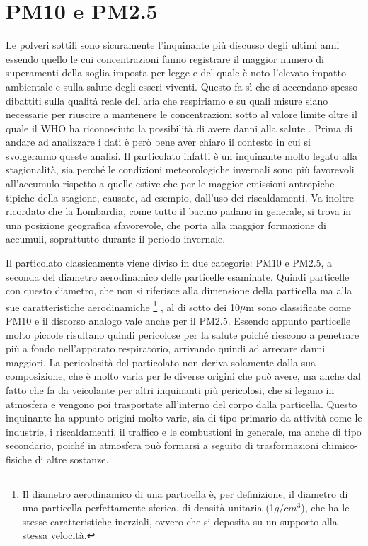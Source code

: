 \section{PM10 e PM2.5}
Le polveri sottili sono sicuramente l'inquinante più discusso degli ultimi anni essendo quello le cui concentrazioni fanno registrare il maggior numero di superamenti della soglia imposta per legge e del quale è noto l'elevato impatto ambientale e sulla salute degli esseri viventi. Questo fa sì che si accendano spesso dibattiti sulla qualità reale dell'aria che respiriamo e su quali misure siano necessarie per riuscire a mantenere le concentrazioni sotto al valore limite oltre il quale il WHO ha riconosciuto la possibilità di avere danni alla salute \cite{world2006air}. Prima di andare ad analizzare i dati è però bene aver chiaro il contesto in cui si svolgeranno queste analisi. Il particolato infatti è un inquinante molto legato alla stagionalità, sia perché le condizioni meteorologiche invernali sono più favorevoli all'accumulo rispetto a quelle estive che per le maggior emissioni antropiche tipiche della stagione, causate, ad esempio, dall'uso dei riscaldamenti. Va inoltre ricordato che la Lombardia, come tutto il bacino padano in generale, si trova in una posizione geografica sfavorevole, che porta alla maggior formazione di accumuli, soprattutto durante il periodo invernale.

Il particolato classicamente viene diviso in due categorie: PM10 e PM2.5, a seconda del diametro aerodinamico delle particelle esaminate. Quindi particelle con questo diametro, che non si riferisce alla dimensione della particella ma alla sue caratteristiche aerodinamiche
\footnote{Il diametro aerodinamico di una particella è, per definizione, il diametro di una particella perfettamente sferica, di densità unitaria (1$g/cm^3$), che ha le stesse caratteristiche inerziali, ovvero che si deposita su un supporto alla stessa velocità.}
, al di sotto dei 10$\mu$m sono classificate come PM10 e il discorso analogo vale anche per il PM2.5. Essendo appunto particelle molto piccole risultano quindi pericolose per la salute poiché riescono a penetrare più a fondo nell'apparato respiratorio, arrivando quindi ad arrecare danni maggiori.
La pericolosità del particolato non deriva solamente dalla sua composizione, che è molto varia per le diverse origini che può avere, ma anche dal fatto che fa da veicolante per altri inquinanti più pericolosi, che si legano in atmosfera e vengono poi trasportate all'interno del corpo dalla particella. Questo inquinante ha appunto origini molto varie, sia di tipo primario da attività come le industrie, i riscaldamenti, il traffico e le combustioni in generale, ma anche di tipo secondario, poiché in atmosfera può formarsi a seguito di trasformazioni chimico-fisiche di altre sostanze.

